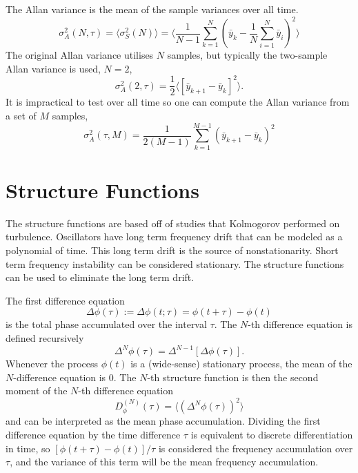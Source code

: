 The Allan variance is the mean of the sample variances over all time.
%
\begin{equation}
\sigma_A^2(N,\tau) = \langle \sigma_S^2(N) \rangle = \bigg\langle \frac{1}{N-1} \sum_{k=1}^{N} \left(\bar{y}_k - \frac{1}{N} \sum_{i=1}^{N} \bar{y}_i\right)^2 \bigg\rangle
\end{equation}
%
The original Allan variance utilises $N$ samples, but typically the two-sample Allan variance is used, $N=2$,
%
\begin{equation} \label{eq:2sallan}
\sigma_A^2(2, \tau) = \frac{1}{2}\langle [\bar{y}_{k+1} - \bar{y}_{k}]^2 \rangle.
\end{equation}
%
It is impractical to test over all time so one can compute the Allan variance from a set of $M$ samples,
%
\begin{equation}
\sigma_A^2(\tau,M) = \frac{1}{2(M-1)}\sum_{k=1}^{M-1} \left(\bar{y}_{k+1} - \bar{y}_{k}\right)^2
\end{equation}

\section{Structure Functions} \label{sec:structure}

The structure functions are based off of studies that Kolmogorov performed on turbulence. Oscillators have long term frequency drift that can be modeled as a polynomial of time. This long term drift is the source of nonstationarity. Short term frequency instability can be considered stationary. The structure functions can be used to eliminate the long term drift. 

The first difference equation
%
\begin{equation}
\Delta\phi(\tau) := \Delta\phi(t;\tau) = \phi(t+\tau) - \phi(t)
\end{equation}
%
is the total phase accumulated over the interval $\tau$. The $N$-th difference equation is defined recursively
%
\begin{equation}
\Delta^N\phi(\tau) = \Delta^{N-1}\left[\Delta\phi(\tau)\right].
\end{equation}
%
Whenever the process $\phi(t)$ is a (wide-sense) stationary process, the mean of the $N$-difference equation is $0$. The $N$-th structure function is then the second moment of the $N$-th difference equation
\begin{equation}
D_\phi^{(N)}(\tau) = \langle (\Delta^N\phi(\tau))^2 \rangle
\end{equation}
%
and can be interpreted as the mean phase accumulation. Dividing the first difference equation by the time difference $\tau$ is equivalent to discrete differentiation in time, so $[\phi(t+\tau) - \phi(t)]/\tau$ is considered the frequency accumulation over $\tau$, and the variance of this term will be the mean frequency accumulation.

